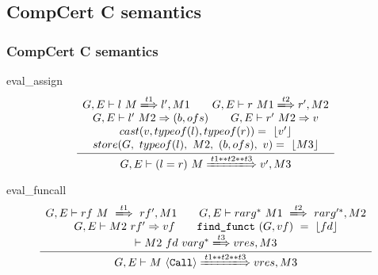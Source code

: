 \documentclass{beamer} %
\begin{document}
\subsection{CompCert C semantics}
\begin{frame}
\frametitle{CompCert C semantics}
\begin{block}{eval\_assign}
\begin{equation}
\frac
{\begin{array}{c}
G,E\vdash l~M\xLongrightarrow{t1}l',M1\qquad
G,E\vdash r~M1\xLongrightarrow{t2}r',M2\\
G,E\vdash l'~M2\Rightarrow (b, ofs)\qquad
G,E\vdash r'~M2\Rightarrow v\\
cast(v,typeof(l),typeof(r))=~\lfloor v'\rfloor\\
store (G,~typeof(l),~M2,~(b,ofs),~v)=~\lfloor M3\rfloor\\
\end{array}
}
{G,E\vdash (l=r)~M\xLongrightarrow{t1**t2**t3}v',M3}
\end{equation}
\end{block}
\begin{block}{eval\_funcall}
\begin{equation}
\frac
{\begin{array}{c}
G,E\vdash rf~M~\xLongrightarrow{t1}~rf',M1\qquad
G,E\vdash rarg^*~M1~\xLongrightarrow{t2}~rarg'^*,M2\\
G,E\vdash M2~rf' \Rightarrow vf\qquad
\texttt{find\_funct}~(G,vf)~=~\lfloor fd\rfloor\\
\vdash M2~fd~varg^* \xLongrightarrow{t3}vres,M3
\end{array}
}
{G,E\vdash M~\langle\textrm{\texttt{Call}}\rangle\xLongrightarrow{t1**t2**t3}vres,M3}
\end{equation}
\end{block}
\end{frame}
\end{document}
